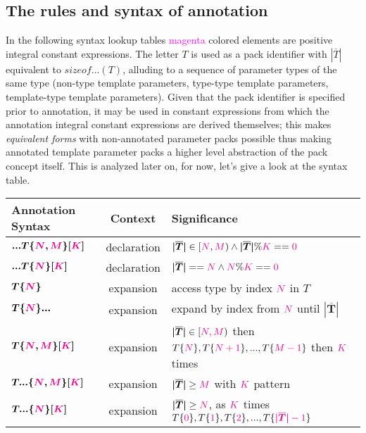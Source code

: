 
\subsection{The rules and syntax of annotation}

\p In the following syntax lookup tables \textcolor{Magenta}{magenta} colored elements are positive integral constant expressions.
The letter $T$ is used as a pack identifier with $|\overline{T}|$ equivalent to $sizeof...(T)$, alluding to a sequence of parameter types of the same type (non-type template parameters, type-type template parameters, template-type template parameters).
Given that the pack identifier is specified prior to annotation, it may be used in constant expressions from which the annotation integral constant expressions are derived themselves; this makes \textit{equivalent forms} with non-annotated parameter packs possible thus making annotated template parameter packs a higher level abstraction of the pack concept itself.
This is analyzed later on, for now, let's give a look at the syntax table.

\begin{tabularx}{\textwidth}{l|c|X}
  \textbf{Annotation Syntax} & \textbf{Context}  &\textbf{Significance} \\
\hline
$\bm{...T\{\textcolor{Magenta}{\textcolor{Magenta}{N}},\textcolor{Magenta}{M}\}[\textcolor{Magenta}{K}]}$ & declaration & $\bm{|\overline{T}|} \in [\textcolor{Magenta}{N},\textcolor{Magenta}{M}) \wedge{} \bm{|\overline{T}|} \% \textcolor{Magenta}{K} == \textcolor{Magenta}{0}$ \\
$\bm{...T\{\textcolor{Magenta}{N}\}[\textcolor{Magenta}{K}]}$ & declaration & $\bm{|\overline{T}|} == \textcolor{Magenta}{N} \wedge{} \textcolor{Magenta}{N} \% \textcolor{Magenta}{K} == \textcolor{Magenta}{0}$ \\
$\bm{T\{\textcolor{Magenta}{N}\}}$ & expansion & access type by index $\textcolor{Magenta}{N}$ in $T$ \\
$\bm{T\{\textcolor{Magenta}{N}\}...}$ & expansion& expand by index from $\textcolor{Magenta}{N}$ until $\bm{|\overline{T}|}$ \\
$\bm{T\{\textcolor{Magenta}{N},\textcolor{Magenta}{M}\}[\textcolor{Magenta}{K}]}$ & expansion & $\bm{|\overline{T}|}\in {[\textcolor{Magenta}{N,M}})$ then $ T\{\textcolor{Magenta}{N}\},T\{\textcolor{Magenta}{N+1}\},...,T\{\textcolor{Magenta}{M-1}\}$ then $\textcolor{Magenta}{K}$ times \\
$\bm{T...\{\textcolor{Magenta}{N},\textcolor{Magenta}{M}\}[\textcolor{Magenta}{K}]}$ & expansion & $\bm{|\overline{T}|}\geq{\textcolor{Magenta}{M}}$ with $\textcolor{Magenta}{K}$ pattern\\
$\bm{T...\{\textcolor{Magenta}{N}\}[\textcolor{Magenta}{K}]}$ & expansion & $\bm{|\overline{T}|}\geq{\textcolor{Magenta}{N}}$, as $\textcolor{Magenta}{K}$ times $T\{\textcolor{Magenta}{0}\},T\{\textcolor{Magenta}{1}\},T\{\textcolor{Magenta}{2}\},...,T\{\textcolor{Magenta}{\bm{|\overline{T}|}-1}\}$ \\
\end{tabularx}

